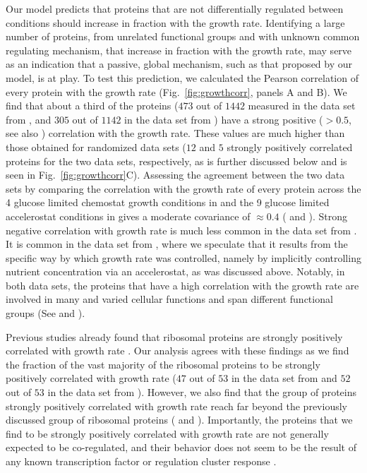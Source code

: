\documentclass[10pt,letterpaper]{article}
\newcommand{\hTotal}{$1442$}
\newcommand{\hGlobal}{$473$}
\newcommand{\hGlobalShuff}{$12$}
\newcommand{\vnTotal}{$1142$}
\newcommand{\vTotal}{\vnTotal{}}
\newcommand{\vnGlobalShuff}{$5$}
\newcommand{\vGlobalShuff}{\vnGlobalShuff{}}
\newcommand{\vnGlobal}{$305$}
\newcommand{\vGlobal}{\vnGlobal{}}
\newcommand{\hRibs}{$53$}
\newcommand{\hCorrRibs}{$47$}
\newcommand{\vnRibs}{$53$}
\newcommand{\vRibs}{\vnRibs{}}
\newcommand{\vnCorrRibs}{$52$}
\newcommand{\vCorrRibs}{\vnCorrRibs{}}
\begin{document}
Our model predicts that proteins that are not differentially regulated between conditions should increase in fraction with the growth rate.
Identifying a large number of proteins, from unrelated functional groups and with unknown common regulating mechanism, that increase in fraction with the growth rate, may serve as an indication that a passive, global mechanism, such as that proposed by our model, is at play.
To test this prediction, we calculated the Pearson correlation of every protein with the growth rate (Fig.~\ref{fig:growthcorr}, panels A and B).
We find that about a third of the proteins (\hGlobal{} out of \hTotal{} measured in the data set from \cite{Schmidt2015}, and \vGlobal{} out of \vTotal{} in the data set from \cite{Peebo_2015}) have a strong positive ($>0.5$, see also ) correlation with the growth rate.
These values are much higher than those obtained for randomized data sets (\hGlobalShuff{} and \vGlobalShuff{} strongly positively correlated proteins for the two data sets, respectively, as is further discussed below and is seen in Fig.~\ref{fig:growthcorr}C).
Assessing the agreement between the two data sets by comparing the correlation with the growth rate of every protein across the 4 glucose limited chemostat growth conditions in \cite{Schmidt2015} and the 9 glucose limited accelerostat conditions in \cite{Peebo_2015} gives a moderate covariance of $\approx 0.4$ ( and ).
Strong negative correlation with growth rate is much less common in the data set from \cite{Schmidt2015}.
It is common in the data set from \cite{Peebo_2015}, where we speculate that it results from the specific way by which growth rate was controlled, namely by implicitly controlling nutrient concentration via an accelerostat, as was discussed above.
Notably, in both data sets, the proteins that have a high correlation with the growth rate are involved in many and varied cellular functions and span different functional groups (See  and ).


Previous studies already found that ribosomal proteins are strongly positively correlated with growth rate \cite{Pedersen1978a, ingraham1983growth, Klumpp2008}.
Our analysis agrees with these findings as we find the fraction of the vast majority of the ribosomal proteins to be strongly positively correlated with growth rate (\hCorrRibs{} out of \hRibs{} in the data set from \cite{Schmidt2015} and \vCorrRibs{} out of \vRibs{} in the data set from \cite{Peebo_2015}).
However, we also find that the group of proteins strongly positively correlated with growth rate reach far beyond the previously discussed group of ribosomal proteins ( and ).
Importantly, the proteins that we find to be strongly positively correlated with growth rate are not generally expected to be co-regulated, and their behavior does not seem to be the result of any known transcription factor or regulation cluster response \cite{23203884}.
\end{document}
